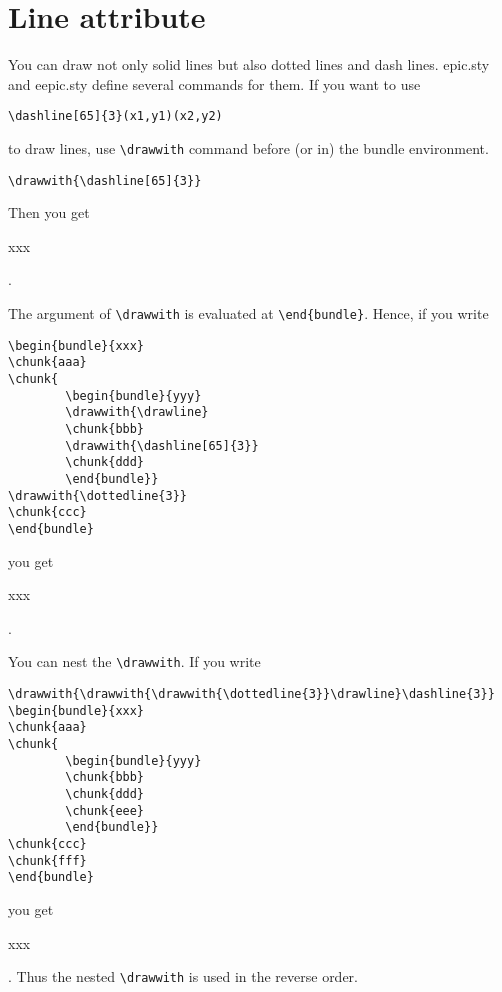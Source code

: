 \section{Line attribute}

You can draw not only solid lines but also
dotted lines and dash lines.
epic.sty and eepic.sty define several commands for them.
If you want to use
\begin{verbatim}
\dashline[65]{3}(x1,y1)(x2,y2)
\end{verbatim}
to draw lines, use \verb|\drawwith| command
before (or in) the bundle environment.
\begin{verbatim}
\drawwith{\dashline[65]{3}}
\end{verbatim}

Then you get
\begin{bundle}{xxx}
\end{bundle}.

The argument of \verb|\drawwith| is evaluated
at \verb|\end{bundle}|. Hence, if you write
\begin{verbatim}
\begin{bundle}{xxx}
\chunk{aaa}
\chunk{
        \begin{bundle}{yyy}
        \drawwith{\drawline}
        \chunk{bbb}
        \drawwith{\dashline[65]{3}}
        \chunk{ddd}
        \end{bundle}}
\drawwith{\dottedline{3}}
\chunk{ccc}
\end{bundle}
\end{verbatim}
you get
\begin{bundle}{xxx}
\end{bundle}.

You can nest the \verb|\drawwith|. If you write
\begin{verbatim}
\drawwith{\drawwith{\drawwith{\dottedline{3}}\drawline}\dashline{3}}
\begin{bundle}{xxx}
\chunk{aaa}
\chunk{
        \begin{bundle}{yyy}
        \chunk{bbb}
        \chunk{ddd}
        \chunk{eee}
        \end{bundle}}
\chunk{ccc}
\chunk{fff}
\end{bundle}
\end{verbatim}
you get
\begin{bundle}{xxx}
\end{bundle}.
Thus the nested \verb|\drawwith| is used in the reverse order.

